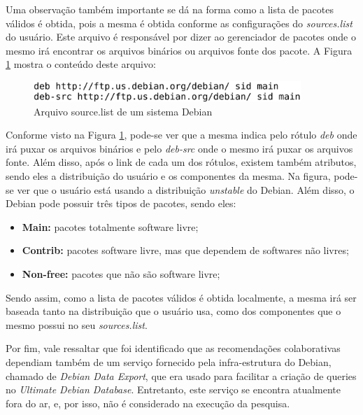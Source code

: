 Uma observação também importante se dá na forma como a lista de pacotes válidos
é obtida, pois a mesma é obtida conforme as configurações do \textit{sources.list} do usuário. Este arquivo é responsável
por dizer ao gerenciador de pacotes onde o mesmo irá encontrar os arquivos binários ou
arquivos fonte dos pacote. A Figura \ref{fig:source_list} mostra o conteúdo deste arquivo:
\\

\begin{figure}[h]
  \centering
  \includegraphics[width=0.9\textwidth]{figuras/source_list.eps}
  \caption{Arquivo source.list de um sistema Debian}
  \label{fig:source_list}
\end{figure}

Conforme visto na Figura \ref{fig:source_list}, pode-se ver que a mesma indica
pelo rótulo \textit{deb} onde irá puxar os arquivos binários e pelo
\textit{deb-src} onde o mesmo irá puxar os arquivos fonte. Além disso, após o
link de cada um dos rótulos, existem também atributos, sendo eles a distribuição
do usuário e os componentes da mesma. Na figura, pode-se ver que o usuário está
usando a distribuição \textit{unstable} do Debian. Além disso, o Debian pode possuir três
tipos de pacotes, sendo eles:

\begin{itemize}
    \item \textbf{Main:} pacotes totalmente software livre;
    \item \textbf{Contrib:} pacotes software livre, mas que dependem de
        softwares não livres;
    \item \textbf{Non-free:} pacotes que não são software livre;
\end{itemize}

Sendo assim, como a lista de pacotes válidos é obtida localmente, a mesma irá ser baseada tanto na
distribuição que o usuário usa, como dos componentes que o mesmo possui no seu
\textit{sources.list}.

Por fim, vale ressaltar que foi identificado que as recomendações
colaborativas dependiam também de um serviço fornecido pela infra-estrutura do
Debian, chamado de \textit{Debian Data Export}, que era usado para facilitar a criação de
queries no \textit{Ultimate Debian Database}. Entretanto, este serviço se encontra
atualmente fora do ar, e, por isso, não é considerado na execução da pesquisa.

